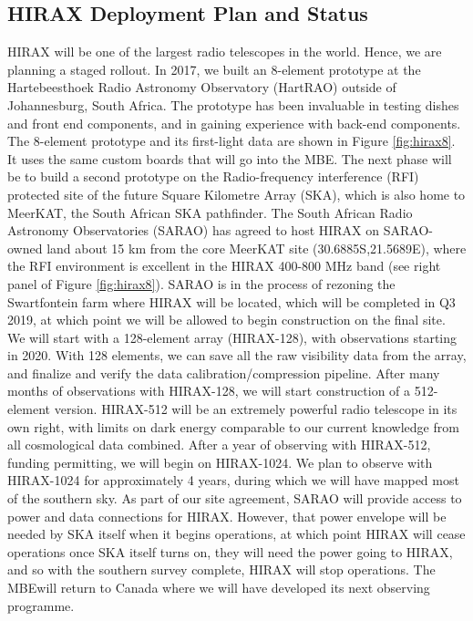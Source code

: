 \documentclass[letterpaper,11pt,preprint]{aastex}
\newcommand{\mbe}{{\rm MBE}}
\begin{document}
\subsection{HIRAX Deployment Plan and Status}

HIRAX will be one of the largest radio telescopes in the world.
Hence, we are planning a staged rollout.  In 2017, we built an
8-element prototype at the Hartebeesthoek Radio Astronomy Observatory
(HartRAO) outside of Johannesburg, South Africa.  The prototype has
been invaluable in testing dishes and front end components, and in
gaining experience with back-end components.  The 8-element prototype
and its first-light data are shown in Figure \ref{fig:hirax8}.  It
uses the same custom boards that will go into the \mbe.  The next
phase will be to build a second prototype on the Radio-frequency
interference (RFI) protected site of the future Square Kilometre Array
(SKA), which is also home to MeerKAT, the South African SKA
pathfinder.  The South African Radio Astronomy Observatories (SARAO)
has agreed to host HIRAX on SARAO-owned land about 15 km from the core
MeerKAT site (30.6885S,21.5689E), where the RFI
environment is excellent in the HIRAX 400-800 MHz band (see right
panel of Figure \ref{fig:hirax8}). SARAO is in
the process of rezoning the Swartfontein farm where HIRAX will be
located, which will be completed in Q3 2019, at which point we will be
allowed to begin construction on the final site.  We will start with a
128-element array (HIRAX-128), with observations starting in 2020.
With 128 elements, we can save all the raw visibility data from the
array, and finalize and verify the data calibration/compression
pipeline.  After many months of observations with HIRAX-128, we will
start construction of a 512-element version.  HIRAX-512 will be an
extremely powerful radio telescope in its own right, with limits on
dark energy comparable to our current knowledge from all cosmological
data combined.  After a year of observing with HIRAX-512, funding
permitting, we will begin on HIRAX-1024.  We plan to observe with 
HIRAX-1024 for approximately 4 years, during which we will have
mapped most of the southern sky.   As part of our site
agreement, SARAO will provide access to power and data connections for
HIRAX.  However, that power envelope will be needed by SKA itself when
it begins operations, at which point HIRAX will cease operations
 once SKA itself turns on, they will need the power going to HIRAX,
 and so with the southern survey complete, HIRAX will stop
 operations.  The \mbe will return to Canada where we will have
 developed its next observing programme.
\end{document}
